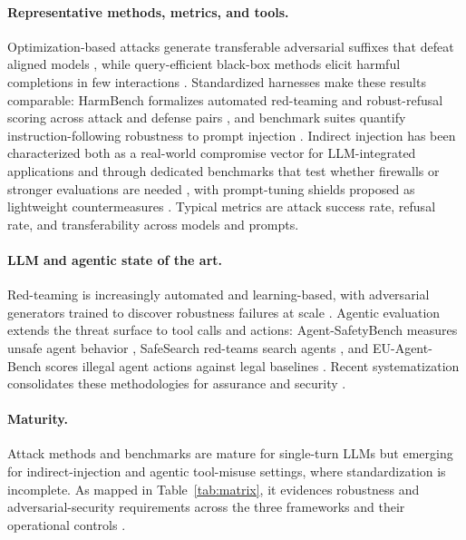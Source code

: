 \paragraph{Representative methods, metrics, and tools.} Optimization-based attacks generate transferable adversarial suffixes that defeat aligned models \cite{zou2023universal}, while query-efficient black-box methods elicit harmful completions in few interactions \cite{carlini2023extracting}. Standardized harnesses make these results comparable: HarmBench formalizes automated red-teaming and robust-refusal scoring across attack and defense pairs \cite{mazeika2024harmbench}, and benchmark suites quantify instruction-following robustness to prompt injection \cite{hendrycks2023advbench}. Indirect injection has been characterized both as a real-world compromise vector for LLM-integrated applications \cite{greshake2023notwhat} and through dedicated benchmarks that test whether firewalls or stronger evaluations are needed \cite{wang2024indirect}, with prompt-tuning shields proposed as lightweight countermeasures \cite{rai2024soft}. Typical metrics are attack success rate, refusal rate, and transferability across models and prompts.

\paragraph{LLM and agentic state of the art.} Red-teaming is increasingly automated and learning-based, with adversarial generators trained to discover robustness failures at scale \cite{kang2025learning,liu2025automatic}. Agentic evaluation extends the threat surface to tool calls and actions: Agent-SafetyBench measures unsafe agent behavior \cite{zhang2024agent}, SafeSearch red-teams search agents \cite{gu2025safesearch}, and EU-Agent-Bench scores illegal agent actions against legal baselines \cite{peng2025eu}. Recent systematization consolidates these methodologies for assurance and security \cite{wang2026systematic}.

\paragraph{Maturity.} Attack methods and benchmarks are mature for single-turn LLMs but emerging for indirect-injection and agentic tool-misuse settings, where standardization is incomplete. As mapped in Table~\ref{tab:matrix}, it evidences robustness and adversarial-security requirements across the three frameworks and their operational controls \cite{nist2024genai,iso42001}.

